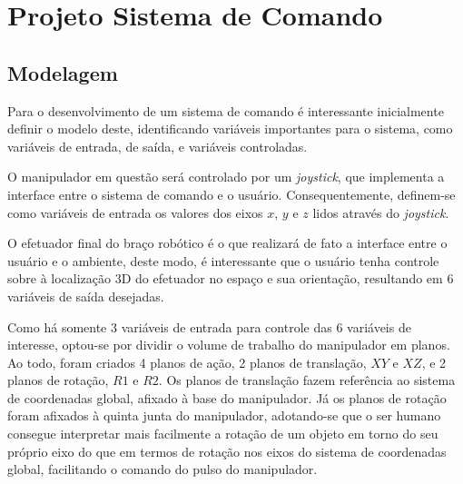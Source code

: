 \chapter{Projeto Sistema de Comando}


\label{CapProjCont}


\section{Modelagem}
Para o desenvolvimento de um sistema de comando é interessante inicialmente
definir o modelo deste, identificando variáveis importantes para o sistema,
como variáveis de entrada, de saída, e variáveis controladas.

O manipulador em questão será controlado por um \textit{joystick}, 
que implementa a interface entre o sistema de comando e o usuário. 
Consequentemente, definem-se como variáveis de entrada os valores 
dos eixos $x$, $y$ e $z$ lidos através do \textit{joystick}.

O efetuador final do braço robótico é o que realizará de fato a
interface entre o usuário e o ambiente, deste modo, é interessante
que o usuário tenha controle sobre à localização 3D do efetuador
no espaço e sua orientação, resultando em 6 variáveis de saída desejadas.

Como há somente 3 variáveis de entrada para controle das 6 variáveis de 
interesse, optou-se por dividir o volume de trabalho do manipulador em 
planos. Ao todo, foram criados 4 planos de ação, 2 planos de translação, 
$XY$ e $XZ$, e 2 planos de rotação, $R1$ e $R2$. Os planos de translação
fazem referência ao sistema de coordenadas global, afixado à base do 
manipulador. Já os planos de rotação foram afixados à quinta junta do manipulador, 
adotando-se que o ser humano consegue interpretar mais facilmente a rotação 
de um objeto em torno do seu próprio eixo do que em termos de rotação nos 
eixos do sistema de coordenadas global, facilitando o comando do pulso do manipulador. 

